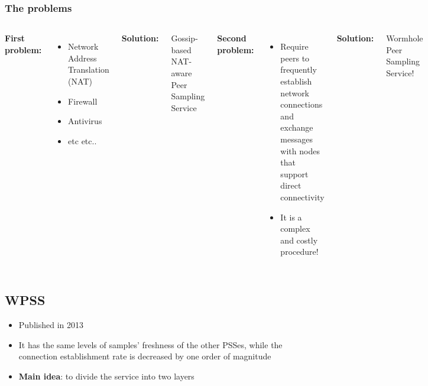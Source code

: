 \documentclass{beamer}
\begin{document}
\begin{frame}
\frametitle{The problems}
\begin{columns}[t] %

\textbf{First problem:}

\begin{itemize}
	\item Network Address Translation (NAT)
	\item Firewall
	\item Antivirus
	\item etc etc..
\end{itemize}

\pause
\textbf{Solution:}

Gossip-based NAT-aware Peer Sampling Service


\textbf{Second problem:}
\begin{itemize}
	\item Require peers to frequently establish network connections and exchange messages with nodes that support direct connectivity
	\item It is a complex and costly procedure!
\end{itemize}
\pause
\textbf{Solution:}

Wormhole Peer Sampling Service!

\end{columns}
\end{frame}

\subsection{WPSS}

\begin{frame}
\begin{itemize}
	\item Published in 2013
	\item It has the same levels of samples' freshness  of the other PSSes, while the connection establishment rate is decreased by one order of magnitude
	\pause
	\item \textbf{Main idea}: to divide the service into two layers
\end{itemize}
\end{frame}
\end{document}
